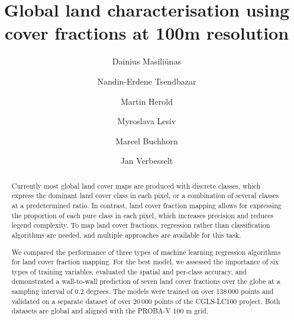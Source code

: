 \documentclass[review,authoryear,3p]{elsarticle}
\begin{document}
\begin{frontmatter} %

\title{Global land characterisation using cover fractions at 100m resolution}

\author[WURGRS]{Dainius Masiliūnas}

\author[WURGRS]{Nandin-Erdene Tsendbazar}

\author[WURGRS]{Martin Herold}

\author[IIASA]{Myroslava Lesiv}

\author[VITO]{Marcel Buchhorn}

\author[WURGRS]{Jan Verbesselt}

\address[WURGRS]{Wageningen University \& Research, Laboratory of Geo-Information Science and Remote Sensing, Droevendaalsesteeg 3, 6708 PB Wageningen, the Netherlands}
\address[IIASA]{International Institute for Applied Systems Analysis (IIASA), Schlossplatz 1, A-2361 Laxenburg, Austria}
\address[VITO]{Flemish Institute for Technological Research (VITO), Boeretang 200, BE-2400 Mol, Belgium}

\begin{abstract} %
Currently most global land cover maps are produced with discrete classes, which express the dominant land cover class in each pixel, or a combination of several classes at a predetermined ratio. In contrast, land cover fraction mapping allows for expressing the proportion of each pure class in each pixel, which increases precision and reduces legend complexity. To map land cover fractions, regression rather than classification algorithms are needed, and multiple approaches are available for this task.

We compared the performance of three types of machine learning regression algorithms for land cover fraction mapping.
For the best model, we assessed the importance of six types of training variables, evaluated the spatial and per-class accuracy, and demonstrated a wall-to-wall prediction of seven land cover fractions over the globe at a sampling interval of 0.2 degrees.
The models were trained on over 138\,000 points and validated on a separate dataset of over 20\,000 points of the \gls{CGLS-LC100} project. Both datasets are global and aligned with the PROBA-V 100 m grid.


\end{abstract}
\end{frontmatter}
\end{document}
